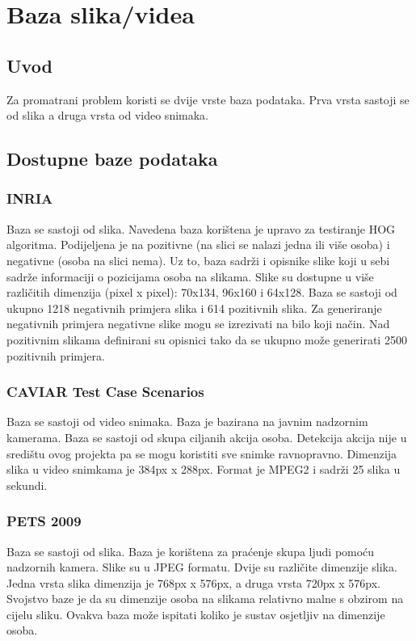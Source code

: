 \documentclass[times, utf8, seminar, numeric]{fer}
\begin{document}
\chapter{Baza slika/videa}

\section{Uvod}

Za promatrani problem koristi se dvije vrste baza podataka. Prva vrsta sastoji 
se od slika a druga vrsta od video snimaka.  

\section{Dostupne baze podataka}

\subsection{INRIA}

Baza se sastoji od slika. Navedena baza korištena je upravo za testiranje HOG 
algoritma. Podijeljena je na pozitivne (na slici se nalazi jedna ili više osoba)
i negativne (osoba na slici nema). Uz to, baza sadrži i opisnike slike koji
u sebi sadrže informaciji o pozicijama osoba na slikama. Slike su dostupne u
više različitih dimenzija (pixel x pixel): 70x134, 96x160 i 64x128.  
Baza se sastoji od ukupno 1218 negativnih primjera slika i 614 pozitivnih slika.
Za generiranje negativnih primjera negativne slike mogu se izrezivati na bilo
koji način. Nad pozitivnim slikama definirani su opisnici tako da se ukupno 
može generirati 2500 pozitivnih primjera.

\subsection{CAVIAR Test Case Scenarios}

Baza se sastoji od video snimaka. Baza je bazirana na javnim nadzornim kamerama.
Baza se sastoji od skupa ciljanih akcija osoba. Detekcija akcija nije u središtu
ovog projekta pa se mogu koristiti sve snimke ravnopravno. Dimenzija slika u 
video snimkama je 384px x 288px. Format je MPEG2 i sadrži 25 slika u sekundi.

\subsection{PETS 2009}

Baza se sastoji od slika. 
Baza je korištena za praćenje skupa ljudi pomoću nadzornih kamera. Slike su
u JPEG formatu. Dvije su različite dimenzije slika. Jedna vrsta slika dimenzija 
je 768px x 576px, a druga vrsta 720px x 576px. Svojstvo baze je da su dimenzije
osoba na slikama relativno malne s obzirom na cijelu sliku. Ovakva baza može
ispitati koliko je sustav osjetljiv na dimenzije osoba.  
\end{document}
